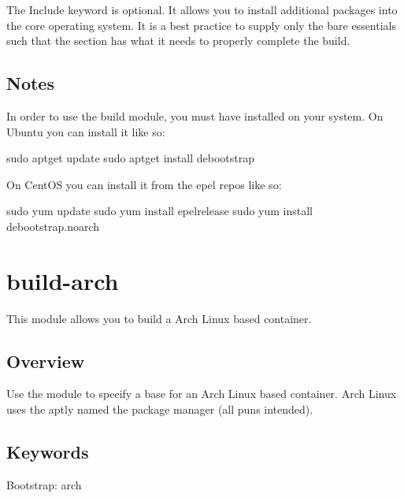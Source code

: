 \documentclass[letterpaper,10pt,english]{sphinxmanual}
\begin{document}
The Include keyword is optional. It allows you to install additional packages into the core operating system. It is a best practice to supply only the bare essentials
such that the  section has what it needs to properly complete the build.


\subsection{Notes}
\label{\detokenize{appendix:id17}}
In order to use the  build module, you must have  installed on your system. On Ubuntu you can install it like so:

%
\begin{sphinxVerbatim}[commandchars=\\\{\}]
\PYGZdl{} sudo apt\PYGZhy{}get update \PYGZam{}\PYGZam{} sudo apt\PYGZhy{}get install debootstrap
\end{sphinxVerbatim}

On CentOS you can install it from the epel repos like so:

%
\begin{sphinxVerbatim}[commandchars=\\\{\}]
\PYGZdl{} sudo yum update \PYGZam{}\PYGZam{} sudo yum install epel\PYGZhy{}release \PYGZam{}\PYGZam{} sudo yum install debootstrap.noarch
\end{sphinxVerbatim}


\section{build-arch}
\label{\detokenize{appendix:build-arch}}\label{\detokenize{appendix:id18}}\label{\detokenize{appendix:sec-build-arch}}
This module allows you to build a Arch Linux based container.


\subsection{Overview}
\label{\detokenize{appendix:id19}}
Use the  module to specify a base for an Arch Linux based container. Arch Linux uses the aptly named the  package manager (all puns intended).


\subsection{Keywords}
\label{\detokenize{appendix:id20}}
%
\begin{sphinxVerbatim}[commandchars=\\\{\}]
Bootstrap: arch
\end{sphinxVerbatim}
\end{document}
